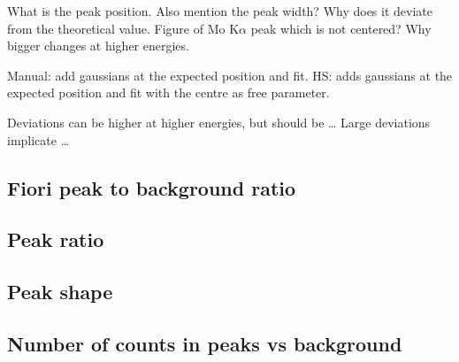 What is the peak position.
Also mention the peak width?
Why does it deviate from the theoretical value.
Figure of Mo K$\alpha$ peak which is not centered?
Why bigger changes at higher energies.

Manual: add gaussians at the expected position and fit.
HS: adds gaussians at the expected position and fit with the centre as free parameter.

Deviations can be higher at higher energies, but should be \dots
Large deviations implicate \dots



\subsection{Fiori peak to background ratio}
\label{theory:qc:fiori}


\subsection{Peak ratio}
\label{theory:qc:peakratio}


\subsection{Peak shape}
\label{theory:qc:peakshape}


\subsection{Number of counts in peaks vs background}
\label{theory:qc:counts}


